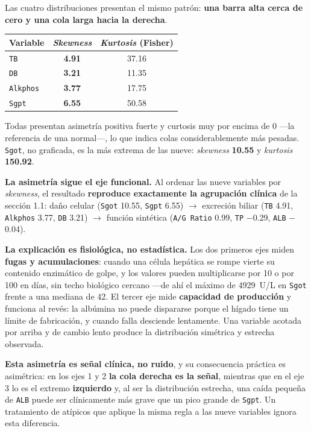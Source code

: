 \documentclass[10pt,a4paper]{article}
\begin{document}
Las cuatro distribuciones presentan el mismo patrón: \textbf{una barra alta cerca de cero y una cola larga hacia la derecha}.

\begin{table}[H]
\footnotesize
\centering
\begin{tabular}{@{}lcc@{}}
\toprule
\textbf{Variable} & \textbf{\textit{Skewness}} & \textbf{\textit{Kurtosis} (Fisher)} \\
\midrule
\texttt{TB} & \textbf{4.91} & 37.16 \\
\texttt{DB} & \textbf{3.21} & 11.35 \\
\texttt{Alkphos} & \textbf{3.77} & 17.75 \\
\texttt{Sgpt} & \textbf{6.55} & 50.58 \\
\bottomrule
\end{tabular}
\end{table}

Todas presentan asimetría positiva fuerte y curtosis muy por encima de 0 ---la referencia de una normal---, lo que indica colas considerablemente más pesadas. \texttt{Sgot}, no graficada, es la más extrema de las nueve: \textit{skewness} \textbf{10.55} y \textit{kurtosis} \textbf{150.92}.

\textbf{La asimetría sigue el eje funcional.} Al ordenar las nueve variables por \textit{skewness}, el resultado \textbf{reproduce exactamente la agrupación clínica} de la sección 1.1: daño celular (\texttt{Sgot} 10.55, \texttt{Sgpt} 6.55) $\rightarrow$ excreción biliar (\texttt{TB} 4.91, \texttt{Alkphos} 3.77, \texttt{DB} 3.21) $\rightarrow$ función sintética (\texttt{A/G Ratio} 0.99, \texttt{TP} $-$0.29, \texttt{ALB} $-$0.04).

\textbf{La explicación es fisiológica, no estadística.} Los dos primeros ejes miden \textbf{fugas y acumulaciones}: cuando una célula hepática se rompe vierte su contenido enzimático de golpe, y los valores pueden multiplicarse por 10 o por 100 en días, sin techo biológico cercano ---de ahí el máximo de 4929~U/L en \texttt{Sgot} frente a una mediana de 42. El tercer eje mide \textbf{capacidad de producción} y funciona al revés: la albúmina no puede dispararse porque el hígado tiene un límite de fabricación, y cuando falla desciende lentamente. Una variable acotada por arriba y de cambio lento produce la distribución simétrica y estrecha observada.

\textbf{Esta asimetría es señal clínica, no ruido}, y su consecuencia práctica es asimétrica: en los ejes 1 y 2 \textbf{la cola derecha es la señal}, mientras que en el eje 3 lo es el extremo \textbf{izquierdo} y, al ser la distribución estrecha, una caída pequeña de \texttt{ALB} puede ser clínicamente más grave que un pico grande de \texttt{Sgpt}. Un tratamiento de atípicos que aplique la misma regla a las nueve variables ignora esta diferencia.
\end{document}
